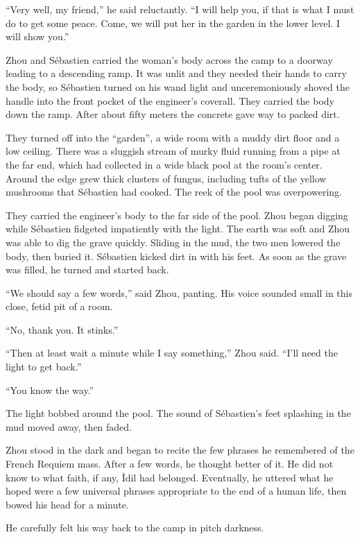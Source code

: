 \documentclass[10pt,b5paper]{article}
\begin{document}
``Very well, my friend,'' he said reluctantly. ``I will help you, if
that is what I must do to get some peace. Come, we will put her in
the garden in the lower level. I will show you.''

\bigskip

Zhou and S\'{e}bastien carried the woman's body across the camp to a
doorway leading to a descending ramp. It was unlit and they needed
their hands to carry the body, so S\'{e}bastien turned on his wand light
and unceremoniously shoved the handle into the front pocket of the
engineer's coverall. They carried the body down the ramp. After
about fifty meters the concrete gave way to packed dirt.

They turned off into the ``garden'', a wide room with a muddy dirt
floor and a low ceiling. There was a sluggish stream of murky fluid
running from a pipe at the far end, which had collected in a wide
black pool at the room's center. Around the edge grew thick clusters
of fungus, including tufts of the yellow mushrooms that S\'{e}bastien
had cooked. The reek of the pool was overpowering.

They carried the engineer's body to the far side of the pool. Zhou
began digging while S\'{e}bastien fidgeted impatiently with the light.
The earth was soft and Zhou was able to dig the grave quickly.
Sliding in the mud, the two men lowered the body, then buried it.
S\'{e}bastien kicked dirt in with his feet. As soon as the grave was
filled, he turned and started back.

``We should say a few words,'' said Zhou, panting. His voice sounded
small in this close, fetid pit of a room.

``No, thank you. It stinks.''

``Then at least wait a minute while I say something,'' Zhou said.
``I'll need the light to get back.''

``You know the way.''

The light bobbed around the pool. The sound of S\'{e}bastien's feet
splashing in the mud moved away, then faded.

Zhou stood in the dark and began to recite the few phrases he
remembered of the French Requiem mass. After a few words, he
thought better of it. He did not know to what faith, if any,
\.{I}dil had belonged. Eventually, he uttered what he hoped were a
few universal phrases appropriate to the end of a human life,
then bowed his head for a minute.

He carefully felt his way back to the camp in pitch darkness.
\end{document}
